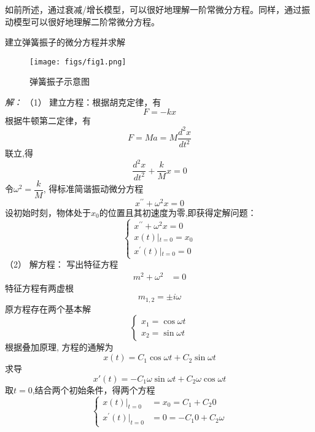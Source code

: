 如前所述，通过衰减/增长模型，可以很好地理解一阶常微分方程。同样，通过振动模型可以很好地理解二阶常微分方程。
 \begin{example} 
	建立弹簧振子的微分方程并求解
	\begin{figure}[htbp]
		\centering
		\texttt{[image: figs/fig1.png]}
		\caption{弹簧振子示意图}
	\end{figure}
\end{example}
		\emph{解：} （1） 建立方程：根据胡克定律，有
		\begin{equation*}
			F= -k x 
			\end{equation*}
		根据牛顿第二定律，有
		\begin{equation*}
			F=Ma= M\frac{d ^2 x}{d t^2} 
		\end{equation*}
		联立,得
     $$\frac{d ^2 x}{d t^2} +\frac{k}{M} x =0$$
	 令$\omega ^2 = \dfrac{k}{M} $, 得标准简谐振动微分方程
	 \begin{equation}
		\boxed{x^{\prime \prime} +\omega ^2 x = 0} 
	\end{equation}
	设初始时刻，物体处于$x_0$的位置且其初速度为零,即获得定解问题：
	\begin{equation}
		\begin{cases}
			x^{\prime \prime} +\omega ^2 x = 0 	\\
			x(t)\left |_{t=0}  =x_0  \right.  \\
			x^{\prime}(t) \left |_{t=0}  =0  \right.      	
			\end{cases}
	\end{equation}
（2） 解方程： 写出特征方程
	$$\begin{aligned}
		m^2+\omega ^2&=0 
	  \end{aligned}$$
	特征方程有两虚根
	  $$ m_{1, 2} =\pm i\omega $$
	原方程存在两个基本解
	  $$ \begin{cases}
		x_{1} =\cos \omega t  \\
		x_{2} =\sin \omega t
	  \end{cases} $$
	根据叠加原理, 方程的通解为
	  \begin{equation}
	 \boxed{x(t)=C_1 \cos \omega t +C_2 \sin \omega t} 	
	  \end{equation}
	求导
	  $$x'(t)=-C_1 \omega \sin \omega t +C_2 \omega\cos \omega t$$
	取$t=0$,结合两个初始条件，得两个方程
	  \[ \left\{
	\begin{aligned}
		x(t)|_{t=0}  &= x_0 =C_1 +C_2 0 \\ 
		x^{\prime}(t)|_{t=0} & =0=-C_1 0 +C_2 \omega 
	\end{aligned}\right.
	\]
